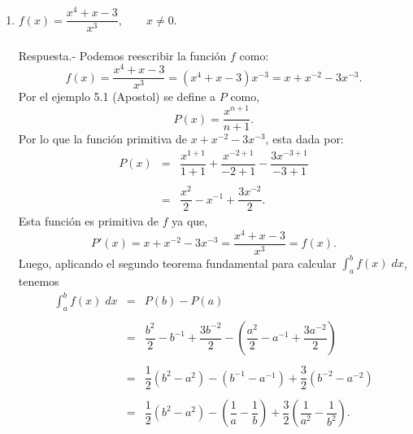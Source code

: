 \begin{enumerate}[\bfseries 1.]
    \item $f(x)=\dfrac{x^4+x-3}{x^3}, \qquad x\neq 0$.\\\\
	Respuesta.-\; Podemos reescribir la función $f$ como:
	$$f(x)=\dfrac{x^4+x-3}{x^3} = \left(x^4+x-3\right)x^{-3} = x+x^{-2}-3x^{-3}.$$
	Por el ejemplo 5.1 (Apostol) se define a $P$ como,
	$$P(x)=\dfrac{x^{n+1}}{n+1}.$$
	Por lo que la función primitiva de $x+x^{-2}-3x^{-3}$, esta dada por:
	$$\begin{array}{rcl}
	    P(x)&=&\dfrac{x^{1+1}}{1+1}+\dfrac{x^{-2+1}}{-2+1}-\dfrac{3x^{-3+1}}{-3+1}\\\\
		&=&\dfrac{x^2}{2}-x^{-1}+\dfrac{3x^{-2}}{2}.
	\end{array}$$
	Esta función es primitiva de $f$ ya que,
	$$P'(x)=x+x^{-2}-3x^{-3}=\dfrac{x^4+x-3}{x^3}=f(x).$$
	Luego, aplicando el segundo teorema fundamental para calcular $\int_a^b f(x)\; dx$, tenemos
	$$\begin{array}{rcl}
	    \displaystyle\int_a^b f(x)\; dx &=& P(b)-P(a)\\\\
					    &=& \dfrac{b^2}{2}-b^{-1}+\dfrac{3b^{-2}}{2}-\left(\dfrac{a^2}{2}-a^{-1}+\dfrac{3a^{-2}}{2}\right)\\\\
					    &=& \dfrac{1}{2}\left(b^2-a^2\right)-\left(b^{-1}-a^{-1}\right)+\dfrac{3}{2}\left(b^{-2}-a^{-2}\right)\\\\
					    &=& \dfrac{1}{2}\left(b^2-a^2\right)-\left(\dfrac{1}{a}-\dfrac{1}{b}\right)+\dfrac{3}{2}\left(\dfrac{1}{a^2}-\dfrac{1}{b^2}\right).
	\end{array}$$
	\vspace{.5cm}


\end{enumerate}
